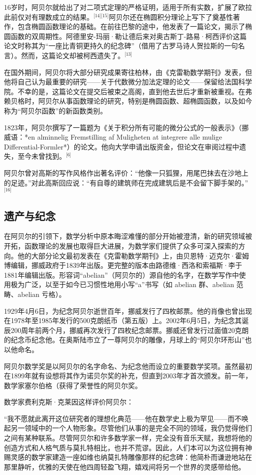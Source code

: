 16岁时，阿贝尔就给出了对二项式定理的严格证明，适用于所有实数，扩展了欧拉此前仅对有理数成立的结果。\(^\text{[14][15]}\)阿贝尔还在椭圆积分理论上写下了奠基性著作，包含椭圆函数理论的基础。在前往巴黎的途中，他发表了一篇论文，揭示了椭圆函数的双周期性。阿德里安-玛丽·勒让德后来对奥古斯丁-路易·柯西评价这篇论文时称其为“一座比青铜更持久的纪念碑”（借用了古罗马诗人贺拉斯的一句名言）。然而，这篇论文却被柯西遗失了。\(^\text{[13]}\)

在国外期间，阿贝尔将大部分研究成果寄往柏林，由《克雷勒数学期刊》发表，但他将自己认为最重要的研究——关于代数微分加法定理的论文——保留给法国科学院。不幸的是，这篇论文在提交后被束之高阁，直到他去世后才重新被重视。在弗赖贝格时，阿贝尔从事函数理论的研究，特别是椭圆函数、超椭圆函数，以及如今称为“阿贝尔函数”的新函数类别。

1823年，阿贝尔撰写了一篇题为《关于积分所有可能的微分公式的一般表示》（挪威语：*en alminnelig Fremstilling af Muligheten at integrere alle mulige Differential-Formler*）的论文。他向大学申请出版资金，但论文在审阅过程中遗失，至今未曾找到。\(^\text{[6]}\)

阿贝尔曾对高斯的写作风格作出著名评价：“他像一只狐狸，用尾巴抹去在沙地上的足迹。”对此高斯回应说：“有自尊的建筑师在完成建筑后是不会留下脚手架的。”\(^\text{[16]}\)
\subsection{遗产与纪念}
在阿贝尔的引领下，数学分析中原本晦涩难懂的部分开始被澄清，新的研究领域被开拓，函数理论的发展也取得巨大进展，为数学家们提供了众多可深入探索的方向。他的大部分论文最初发表在《克雷勒数学期刊》上，由贝恩特·迈克尔·霍姆博编辑，挪威政府于1839年出版。更完整的版本由路德维·西洛和索福斯·李于1881年编辑出版。形容词“abelian”（阿贝尔的）源自他的名字，在数学写作中使用极为广泛，以至于如今已习惯性地用小写“a”书写（如 abelian 群、abelian 范畴、abelian 亏格）。

1929年4月6日，为纪念阿贝尔逝世百年，挪威发行了四枚邮票。他的肖像也曾出现在1978年至1985年发行的500克朗纸币（第五版）上。2002年6月5日，为纪念其诞辰200周年前两个月，挪威再次发行了四枚纪念邮票。挪威还曾发行过面值20克朗的纪念币纪念他。在奥斯陆市立了一尊阿贝尔的雕像，月球上的“阿贝尔环形山”也以他命名。

阿贝尔数学奖是以阿贝尔的名字命名、为纪念他而设立的重要数学奖项。虽然最初在1899年就有设想将其作为诺贝尔奖的补充，但直到2003年才首次颁发。前一年，数学家塞尔伯格（获得了荣誉性的阿贝尔奖。

数学家费利克斯·克莱因这样评价阿贝尔：

“我不愿就此离开这位研究者的理想化典范——他在数学史上极为罕见——而不唤起另一领域中的一个人物形象。尽管他们从事的是完全不同的领域，我仍觉得他们之间有某种联系。尽管阿贝尔和许多数学家一样，完全没有音乐天赋，我想将他的创造方式和人格气质与莫扎特相比，也并不荒谬。因此，人们本可以为这位拥有神赐灵感的数学家建造一座如维也纳莫扎特雕像那样的纪念碑：他简朴而谦逊地站在那里静听，优雅的天使在他四周轻盈飞翔，嬉戏间将另一个世界的灵感带给他。

